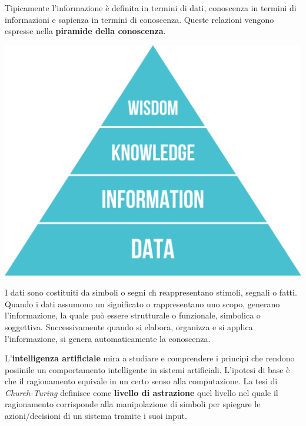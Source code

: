 \documentclass[a4paper]{extarticle}
\begin{document}
Tipicamente l'informazione è definita in termini di dati, conoscenza in termini di informazioni e sapienza in termini di conoscenza. Queste relazioni vengono espresse nella \textbf{piramide della conoscenza}.
\begin{center}
\includegraphics[scale=0.29]{PiramideDIKW}
\end{center}

I dati sono costituiti da simboli o segni ch reappresentano stimoli, segnali o fatti. Quando i dati assumono un significato o rappresentano uno scopo, generano l'informazione, la quale può essere strutturale o funzionale, simbolica o soggettiva. Successivamente quando si elabora, organizza e si applica l'informazione, si genera automaticamente la conoscenza.

L'\textbf{intelligenza artificiale} mira a studiare e comprendere i principi che rendono posiinile un comportamento intelligente in sistemi artificiali. L'ipotesi di base è che il ragionamento equivale in un certo senso alla computazione. La tesi di \textit{Church-Turing} definisce come \textbf{livello di astrazione} quel livello nel quale il ragionamento corrisponde alla manipolazione di simboli per spiegare le azioni/decisioni di un sistema tramite i suoi input.
\end{document}
